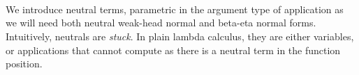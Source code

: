 \documentclass[preliminary,copyright,creativecommons]{eptcs}
\newenvironment{code}{\verbatim}{\endverbatim}
\begin{document}
\begin{code}\>  \AgdaSymbol{(} \AgdaSymbol{:} \AgdaSymbol{)} \AgdaSymbol{:} \AgdaSymbol{(} \AgdaSymbol{:} \AgdaSymbol{)}   \<\\
\>[0]\<[2]\>[2] \<[7]\>[7]\AgdaSymbol{:} \AgdaSymbol{\}} \<[17]\>[17]\AgdaSymbol{(} \AgdaSymbol{:}   \AgdaSymbol{)} \<[50]\>[50]   \<\\
\>[0]\<[2]\>[2] \<[7]\>[7]\AgdaSymbol{:}  \AgdaSymbol{\}} \<[17]\>[17]\AgdaSymbol{(} \AgdaSymbol{:}  \AgdaSymbol{(} \AgdaInductiveConstructor{,} \AgdaSymbol{)} \AgdaSymbol{)} \<[50]\>[50]   \AgdaSymbol{(}  \AgdaSymbol{)}\<\\
\>[0]\<[2]\>[2] \<[7]\>[7]\AgdaSymbol{:}  \AgdaSymbol{\}} \<[17]\>[17]\AgdaSymbol{(} \AgdaSymbol{:}   \AgdaSymbol{(}  \AgdaSymbol{))} \AgdaSymbol{(} \AgdaSymbol{:}   \AgdaSymbol{)} \<[50]\>[50]   \<\end{code}

\noindent
We introduce neutral terms, parametric in the argument type  of
application as we will need both neutral weak-head normal and beta-eta
normal forms. Intuitively, neutrals are \emph{stuck}.
In plain lambda calculus, they are either
variables, or applications that cannot compute as there is a neutral
term in the function position.
\end{document}
